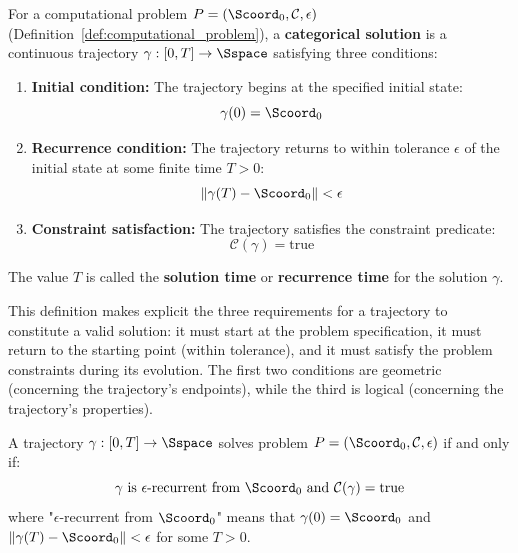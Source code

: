 \begin{definition}
\label{def:categorical_solution}
For a computational problem $P = (\Scoord_0, \mathcal{C}, \epsilon)$ (Definition~\ref{def:computational_problem}), a \textbf{categorical solution} is a continuous trajectory $\gamma: [0, T] \to \Sspace$ satisfying three conditions:
\begin{enumerate}
    \item \textbf{Initial condition:} The trajectory begins at the specified initial state:
    \begin{equation}
    \gamma(0) = \Scoord_0
    \label{eq:initial_condition}
    \end{equation}
    
    \item \textbf{Recurrence condition:} The trajectory returns to within tolerance $\epsilon$ of the initial state at some finite time $T > 0$:
    \begin{equation}
    \|\gamma(T) - \Scoord_0\| < \epsilon
    \label{eq:recurrence_solution}
    \end{equation}
    
    \item \textbf{Constraint satisfaction:} The trajectory satisfies the constraint predicate:
    \begin{equation}
    \mathcal{C}(\gamma) = \text{true}
    \label{eq:constraint_satisfaction}
    \end{equation}
\end{enumerate}
The value $T$ is called the \textbf{solution time} or \textbf{recurrence time} for the solution $\gamma$.
\end{definition}

This definition makes explicit the three requirements for a trajectory to constitute a valid solution: it must start at the problem specification, it must return to the starting point (within tolerance), and it must satisfy the problem constraints during its evolution. The first two conditions are geometric (concerning the trajectory's endpoints), while the third is logical (concerning the trajectory's properties).

\begin{theorem}
\label{thm:solution_recurrence}
A trajectory $\gamma: [0,T] \to \Sspace$ solves problem $P = (\Scoord_0, \mathcal{C}, \epsilon)$ if and only if:
\begin{equation}
\gamma \text{ is } \epsilon\text{-recurrent from } \Scoord_0 \text{ and } \mathcal{C}(\gamma) = \text{true}
\label{eq:solution_equivalence}
\end{equation}
where "$\epsilon$-recurrent from $\Scoord_0$" means that $\gamma(0) = \Scoord_0$ and $\|\gamma(T) - \Scoord_0\| < \epsilon$ for some $T > 0$.
\end{theorem}

